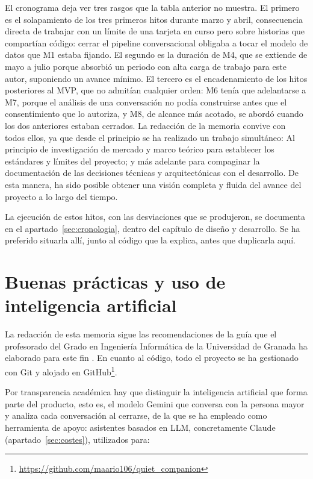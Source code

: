 El cronograma deja ver tres rasgos que la tabla anterior no muestra. El primero es el solapamiento de los
tres primeros hitos durante marzo y abril, consecuencia directa de trabajar con un límite de una tarjeta en
curso pero sobre historias que compartían código: cerrar el pipeline conversacional obligaba a tocar el
modelo de datos que M1 estaba fijando. El segundo es la duración de M4, que se extiende de mayo a julio
porque absorbió un periodo con alta carga de trabajo para este autor, suponiendo un avance mínimo. El tercero
es el encadenamiento de los hitos posteriores al MVP, que no
admitían cualquier orden: M6 tenía que adelantarse a M7, porque el análisis de una conversación no podía
construirse antes que el consentimiento que lo autoriza, y M8, de alcance más acotado, se abordó cuando los
dos anteriores estaban cerrados. La redacción de la memoria convive con todos ellos, ya que desde el principio 
se ha realizado un trabajo simultáneo: Al principio de investigación de mercado y marco teórico para establecer
los estándares y límites del proyecto; y más adelante para compaginar la documentación de las decisiones
técnicas y arquitectónicas con el desarrollo. De esta manera, ha sido posible obtener una visión completa y fluida del
avance del proyecto a lo largo del tiempo.

La ejecución de estos hitos, con las desviaciones que se produjeron, se documenta en el
apartado~\ref{sec:cronologia}, dentro del capítulo de diseño y desarrollo. Se ha preferido situarla allí,
junto al código que la explica, antes que duplicarla aquí.

\section{Buenas prácticas y uso de inteligencia artificial}
\label{sec:buenas-practicas-ia}

La redacción de esta memoria sigue las recomendaciones de la guía que el profesorado del Grado en
Ingeniería Informática de la Universidad de Granada ha elaborado para este fin \citep{GuillenPerales2025}.
En cuanto al código, todo el proyecto se ha gestionado con Git y alojado en
GitHub\footnote{\url{https://github.com/maario106/quiet_companion}}.

Por transparencia académica hay que distinguir la inteligencia artificial que forma parte del producto,
esto es, el modelo Gemini que conversa con la persona mayor y analiza cada conversación al cerrarse, de la
que se ha empleado como herramienta de
apoyo: asistentes basados en LLM, concretamente Claude (apartado~\ref{sec:costes}), utilizados para:

